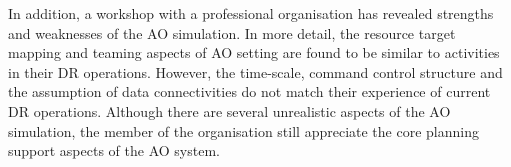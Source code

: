 



In addition, a workshop with a professional organisation has revealed strengths and weaknesses of the \ac{AO} simulation. In more detail, the resource target mapping and teaming aspects of \ac{AO} setting are found to be similar to activities in their \ac{DR} operations. However, the time-scale, command control structure and the assumption of data connectivities do not match their experience of current \ac{DR} operations. Although there are several unrealistic aspects of the \ac{AO} simulation, the member of the organisation still appreciate the core planning support aspects of the \ac{AO} system.\\

